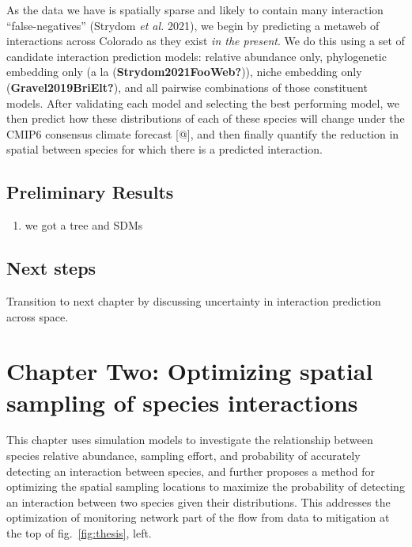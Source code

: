 \documentclass[11pt]{article}
\begin{document}
As the data we have is spatially sparse and likely to contain many
interaction ``false-negatives'' (Strydom \emph{et al.} 2021), we begin
by predicting a metaweb of interactions across Colorado as they exist
\emph{in the present}. We do this using a set of candidate interaction
prediction models: relative abundance only, phylogenetic embedding only
(a la (\textbf{Strydom2021FooWeb?})), niche embedding only
(\textbf{Gravel2019BriElt?}), and all pairwise combinations of those
constituent models. After validating each model and selecting the best
performing model, we then predict how these distributions of each of
these species will change under the CMIP6 consensus climate forecast
{[}@{]}, and then finally quantify the reduction in spatial between
species for which there is a predicted interaction.

\hypertarget{preliminary-results}{%
\subsection{Preliminary Results}\label{preliminary-results}}

\begin{enumerate}
\def\labelenumi{\arabic{enumi})}
\tightlist
\item
  we got a tree and SDMs
\end{enumerate}

\hypertarget{next-steps}{%
\subsection{Next steps}\label{next-steps}}

Transition to next chapter by discussing uncertainty in interaction
prediction across space.

\hypertarget{chapter-two-optimizing-spatial-sampling-of-species-interactions}{%
\section{Chapter Two: Optimizing spatial sampling of species
interactions}\label{chapter-two-optimizing-spatial-sampling-of-species-interactions}}

This chapter uses simulation models to investigate the relationship
between species relative abundance, sampling effort, and probability of
accurately detecting an interaction between species, and further
proposes a method for optimizing the spatial sampling locations to
maximize the probability of detecting an interaction between two species
given their distributions. This addresses the optimization of monitoring
network part of the flow from data to mitigation at the top of
fig.~\ref{fig:thesis}, left.
\end{document}
